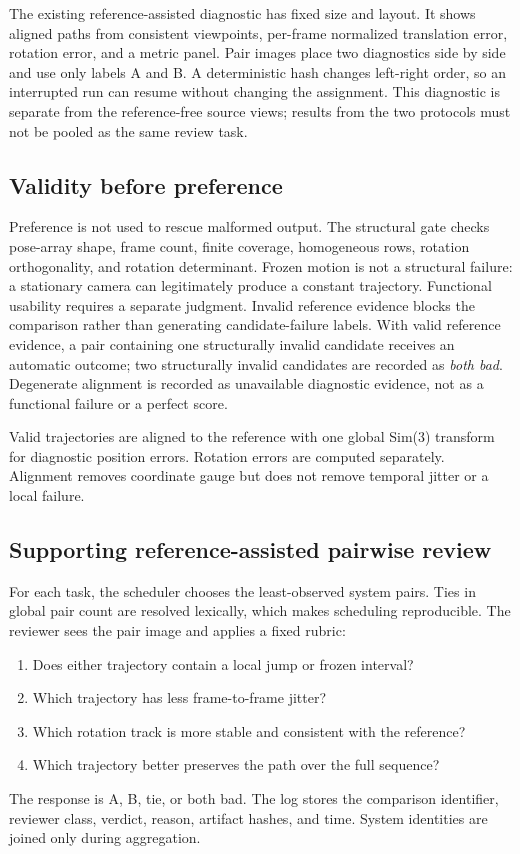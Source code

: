 \documentclass[10pt,twocolumn]{article}
\begin{document}
The existing reference-assisted diagnostic has fixed size and layout. It shows aligned paths from consistent viewpoints, per-frame normalized translation error, rotation error, and a metric panel. Pair images place two diagnostics side by side and use only labels A and B. A deterministic hash changes left-right order, so an interrupted run can resume without changing the assignment. This diagnostic is separate from the reference-free source views; results from the two protocols must not be pooled as the same review task.

\subsection{Validity before preference}
Preference is not used to rescue malformed output. The structural gate checks pose-array shape, frame count, finite coverage, homogeneous rows, rotation orthogonality, and rotation determinant. Frozen motion is not a structural failure: a stationary camera can legitimately produce a constant trajectory. Functional usability requires a separate judgment. Invalid reference evidence blocks the comparison rather than generating candidate-failure labels. With valid reference evidence, a pair containing one structurally invalid candidate receives an automatic outcome; two structurally invalid candidates are recorded as \emph{both bad}. Degenerate alignment is recorded as unavailable diagnostic evidence, not as a functional failure or a perfect score.

Valid trajectories are aligned to the reference with one global Sim(3) transform for diagnostic position errors. Rotation errors are computed separately. Alignment removes coordinate gauge but does not remove temporal jitter or a local failure.

\subsection{Supporting reference-assisted pairwise review}
For each task, the scheduler chooses the least-observed system pairs. Ties in global pair count are resolved lexically, which makes scheduling reproducible. The reviewer sees the pair image and applies a fixed rubric:
\begin{enumerate}
  \item Does either trajectory contain a local jump or frozen interval?
  \item Which trajectory has less frame-to-frame jitter?
  \item Which rotation track is more stable and consistent with the reference?
  \item Which trajectory better preserves the path over the full sequence?
\end{enumerate}
The response is A, B, tie, or both bad. The log stores the comparison identifier, reviewer class, verdict, reason, artifact hashes, and time. System identities are joined only during aggregation.
\end{document}
